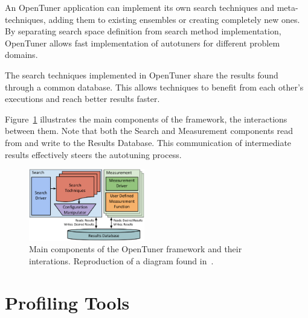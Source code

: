 \documentclass[a4paper, 12pt]{article}
\begin{document}
An OpenTuner application can implement its own search techniques and
meta-techniques, adding them to existing ensembles or creating completely
new ones.
By separating search space definition from search method implementation,
OpenTuner allows fast implementation of autotuners for different
problem domains.

The search techniques implemented in OpenTuner share the results found
through a common database. This allows techniques to benefit from each
other's executions and reach better results faster.

Figure~\ref{fig:opentuner} illustrates the main components of the framework,
the interactions between them. Note that both the Search and Measurement
components read from and write to the Results Database. This communication
of intermediate results effectively steers the autotuning process.

\begin{figure}[H]
    \centering
    \includegraphics[width=0.45\textwidth]{opentuner}
    \captionsetup{width=0.64\textwidth}
    \caption{Main components of the OpenTuner framework and their interations. Reproduction of a diagram found in~\citet{ansel2014opentuner}.}
    \label{fig:opentuner}
\end{figure}

\section{Profiling Tools} \label{sec:profilers}
\end{document}
